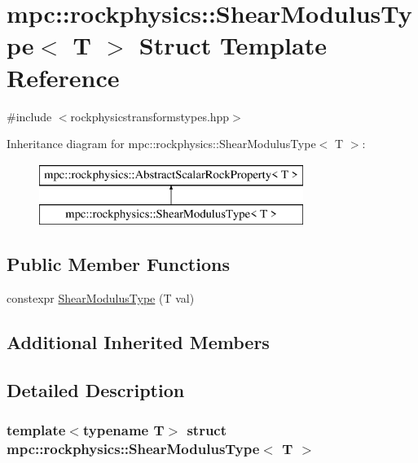\hypertarget{structmpc_1_1rockphysics_1_1_shear_modulus_type}{}\section{mpc\+:\+:rockphysics\+:\+:Shear\+Modulus\+Type$<$ T $>$ Struct Template Reference}
\label{structmpc_1_1rockphysics_1_1_shear_modulus_type}


{\ttfamily \#include $<$rockphysicstransformstypes.\+hpp$>$}

Inheritance diagram for mpc\+:\+:rockphysics\+:\+:Shear\+Modulus\+Type$<$ T $>$\+:\begin{figure}[H]
\begin{center}
\leavevmode
\includegraphics[height=2.000000cm]{structmpc_1_1rockphysics_1_1_shear_modulus_type}
\end{center}
\end{figure}
\subsection*{Public Member Functions}
\begin{DoxyCompactItemize}
\item 
constexpr \mbox{\hyperlink{structmpc_1_1rockphysics_1_1_shear_modulus_type_af7e48ef066d1142209abc498bba19f29}{Shear\+Modulus\+Type}} (T val)
\end{DoxyCompactItemize}
\subsection*{Additional Inherited Members}


\subsection{Detailed Description}
\subsubsection*{template$<$typename T$>$\newline
struct mpc\+::rockphysics\+::\+Shear\+Modulus\+Type$<$ T $>$}



